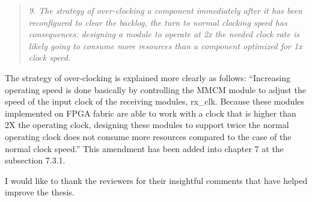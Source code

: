 \documentclass{article}
\begin{document}
\begin{quote}
\emph{9. The strategy of over-clocking a component immediately after it has been reconfigured to clear the backlog, the turn to normal clocking speed has consequences: designing a module to operate at 2x the needed clock rate is likely going to consume more resources than a component optimized for 1x clock speed.}
\end{quote}
The strategy of over-clocking is explained more clearly as follows:
``Increasing operating speed is done basically by controlling the MMCM module to adjust the speed of the input clock of the receiving modules, rx\_clk. Because these modules implemented on FPGA fabric are able to work with a clock that is higher than 2X the operating clock, designing these modules to support twice the normal operating clock does not consume more resources compared to the case of the normal clock speed.''
This amendment has been added into chapter 7 at the subsection 7.3.1.\newline



I would like to thank the reviewers for their insightful comments that have helped improve the thesis.
\end{document}

